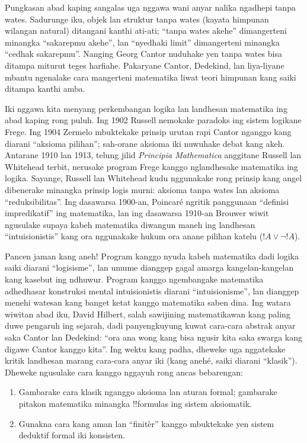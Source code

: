 \documentclass[../../../include/open-logic-section]{subfiles}
\begin{document}
Pungkasan abad kaping sangalas uga nggawa
wani anyar nalika ngadhepi tanpa wates.
Sadurunge iku, objek lan struktur tanpa wates
(kayata himpunan wilangan natural) ditangani kanthi
ati-ati; ``tanpa wates akehe'' dimangerteni
minangka ``sakarepmu akehe'', lan ``nyedhaki
limit'' dimangerteni minangka ``cedhak sakarepmu''.
Nanging Georg Cantor nuduhake yen tanpa wates
bisa ditampa miturut teges harfiahe. Pakaryane
Cantor, Dedekind, lan liya-liyane mbantu
ngenalake cara mangerteni matematika liwat teori
himpunan kang saiki ditampa kanthi amba.

Iki nggawa kita menyang perkembangan logika lan
landhesan matematika ing abad kaping rong puluh.
Ing 1902 Russell nemokake paradoks ing sistem
logikane Frege. Ing 1904 Zermelo mbuktekake
prinsip urutan rapi Cantor nganggo kang diarani
``aksioma pilihan''; sah-orane aksioma iki
nuwuhake debat kang akeh. Antarane 1910 lan 1913,
telung jilid \emph{Principia Mathematica} anggitane
Russell lan Whitehead terbit, nerusake program
Frege kanggo nglandhesake matematika ing logika.
Sayange, Russell lan Whitehead kudu nggunakake
rong prinsip kang angel dibenerake minangka
prinsip logis murni: aksioma tanpa wates lan
aksioma ``reduksibilitas''. Ing dasawarsa 1900-an,
Poincar\'e ngritik panggunaan ``definisi
impredikatif'' ing matematika, lan ing dasawarsa
1910-an Brouwer wiwit ngusulake supaya kabeh
matematika diwangun maneh ing landhesan
``intuisionistis'' kang ora nggunakake hukum
ora anane pilihan katelu ($!A \lor \lnot !A$).

Pancen jaman kang aneh!{} Program kanggo nyuda
kabeh matematika dadi logika saiki diarani
``logisisme'', lan umume dianggep gagal amarga
kangelan-kangelan kang kasebut ing ndhuwur.
Program kanggo ngembangake matematika adhedhasar
konstruksi mental intuisionistis diarani
``intuisionisme'', lan dianggep menehi watesan
kang banget ketat kanggo matematika saben dina.
Ing watara wiwitan abad iku, David Hilbert,
salah sawijining matematikawan kang paling
duwe pengaruh ing sejarah, dadi panyengkuyung
kuwat cara-cara abstrak anyar saka Cantor lan
Dedekind: ``ora ana wong kang bisa ngusir kita
saka swarga kang digawe Cantor kanggo kita''.
Ing wektu kang padha, dheweke uga nggatekake
kritik landhesan marang cara-cara anyar iki
(kang anehé, saiki diarani ``klasik'').
Dheweke ngusulake cara kanggo nggayuh rong
ancas bebarengan:
\begin{enumerate}
\item Gambarake cara klasik nganggo aksioma lan
  aturan formal; gambarake pitakon matematika
  minangka !!{formula}s ing sistem aksiomatik.
\item Gunakna cara kang aman lan ``finitèr''
  kanggo mbuktekake yen sistem deduktif formal
  iki konsisten.
\end{enumerate}
\end{document}
